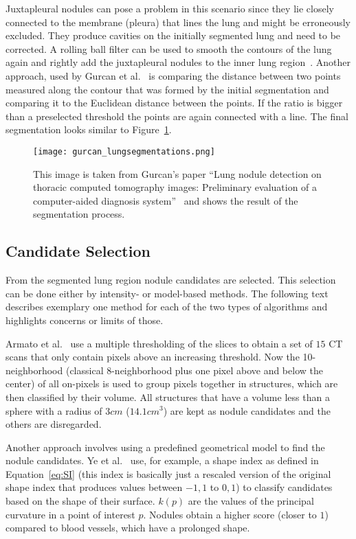 \documentclass[main.tex]{subfiles}
\begin{document}
Juxtapleural nodules can pose a problem in this scenario since they lie closely connected to the membrane (pleura) that lines the lung and might be erroneously excluded. They produce cavities on the initially segmented lung and need to be corrected. A rolling ball filter can be used to smooth the contours of the lung again and rightly add the juxtapleural nodules to the inner lung region~\cite{armato1999computerized}. Another approach, used by Gurcan et al.~\cite{gurcan2002lung} is comparing the distance between two points measured along the contour that was formed by the initial segmentation and comparing it to the Euclidean distance between the points. If the ratio is bigger than a preselected threshold the points are again connected with a line. The final segmentation looks similar to Figure~\ref{fig:segmentation}.

\begin{figure}[ht]
\centering
\texttt{[image: gurcan\_lungsegmentations.png]}
\caption{This image is taken from Gurcan's paper ``Lung nodule detection on thoracic computed tomography images: Preliminary evaluation of a computer-aided diagnosis system''~\cite{gurcan2002lung} and shows the result of the segmentation process.}
\label{fig:segmentation}
\end{figure}


\subsection{Candidate Selection}
From the segmented lung region nodule candidates are selected. This selection can be done either by intensity- or model-based methods. The following text describes exemplary one method for each of the two types of algorithms and highlights concerns or limits of those. 

Armato et al.~\cite{armato1999computerized} use a multiple thresholding of the slices to obtain a set of $15$ CT scans that only contain pixels above an increasing threshold. Now the 10-neighborhood (classical 8-neighborhood plus one pixel above and below the center) of all on-pixels is used to group pixels together in structures, which are then classified by their volume. All structures that have a volume less than a sphere with a radius of $3 cm$ ($14.1cm^3$) are kept as nodule candidates and the others are disregarded.

Another approach involves using a predefined geometrical model to find the nodule candidates. Ye et al.~\cite{ye2009shape} use, for example, a shape index as defined in Equation~\ref{eq:SI} (this index is basically just a rescaled version of the original shape index that produces values between $-1,1$ to $0,1$) to classify candidates based on the shape of their surface. $k(p)$ are the values of the principal curvature in a point of interest $p$. Nodules obtain a higher score (closer to $1$) compared to blood vessels, which have a prolonged shape. 
\end{document}
